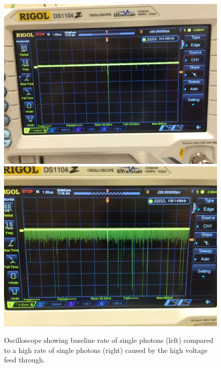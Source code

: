 \begin{figure}[htbp]
\begin{center}
\includegraphics[width=\halffig]{figures/testbed/baseline.jpg}
\includegraphics[width=\halffig]{figures/testbed/phog.jpg}
\caption{Oscilloscope showing baseline rate of single photons (left) compared to a high rate of single photons (right) caused by the high voltage feed through.}
\label{fig:phog}
\end{center}
\end{figure}


